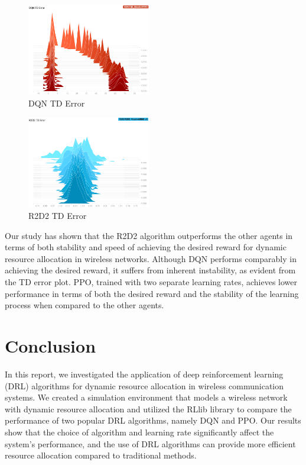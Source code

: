 \documentclass[conference]{IEEEtran}
\begin{document}
\begin{figure}[b!]
    \centering
    \includegraphics[width=0.48\textwidth, height=0.35\textwidth]{figures/DQN_TD.png}
    \caption{DQN TD Error}
    \label{fig:dqntd}
\end{figure}

\begin{figure}[b!]
    \centering
    \includegraphics[width=0.48\textwidth, height=0.35\textwidth]{figures/R2D2_TD.png}
    \caption{R2D2 TD Error}
    \label{fig:r2d2td}
\end{figure}

Our study has shown that the R2D2 algorithm outperforms the other agents in terms of both stability and speed of achieving the desired reward for dynamic resource allocation in wireless networks. Although DQN performs comparably in achieving the desired reward, it suffers from inherent instability, as evident from the TD error plot. PPO, trained with two separate learning rates, achieves lower performance in terms of both the desired reward and the stability of the learning process when compared to the other agents.

\section{Conclusion}
In this report, we investigated the application of deep reinforcement learning (DRL) algorithms for dynamic resource allocation in wireless communication systems. We created a simulation environment that models a wireless network with dynamic resource allocation and utilized the RLlib library to compare the performance of two popular DRL algorithms, namely DQN and PPO. Our results show that the choice of algorithm and learning rate significantly affect the system's performance, and the use of DRL algorithms can provide more efficient resource allocation compared to traditional methods.
\end{document}
